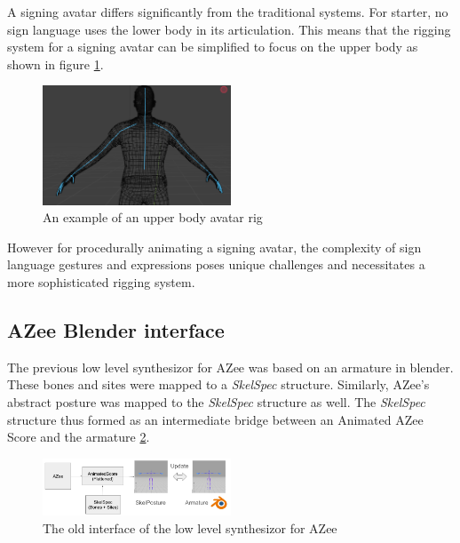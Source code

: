 \documentclass[../../main.tex]{subfiles}
\begin{document}
A signing avatar differs significantly from the traditional systems. For starter, no sign language uses the lower body in its articulation. This means that the rigging system for a signing avatar can be simplified to focus on the upper body as shown in figure \ref{ref:upper_body_avatar}. 

\begin{figure}[h]
    \centering
    \includegraphics[width=0.5\textwidth]{chapters/rigging_layers/images/upper_body_avatar.png}
    \caption{An example of an upper body avatar rig}
    \label{ref:upper_body_avatar}
\end{figure}

However for procedurally animating a signing avatar, the complexity of sign language gestures and expressions poses unique challenges and necessitates a more sophisticated rigging system.

\subsection{AZee Blender interface}

The previous low level synthesizor for AZee \cite{fabrizio} was based on an armature in blender. These bones and sites were mapped to a \emph{SkelSpec} structure. Similarly, AZee's abstract posture was mapped to the \emph{SkelSpec} structure as well. The \emph{SkelSpec} structure thus formed as an intermediate bridge between an Animated AZee Score and the armature \ref{fig:old_interface}. 

\begin{figure}[h]
    \centering
    \includegraphics[width=0.5\textwidth]{chapters/rigging_layers/images/old_interface.png}
    \caption{The old interface of the low level synthesizor for AZee}
    \label{fig:old_interface}
\end{figure}
\end{document}
